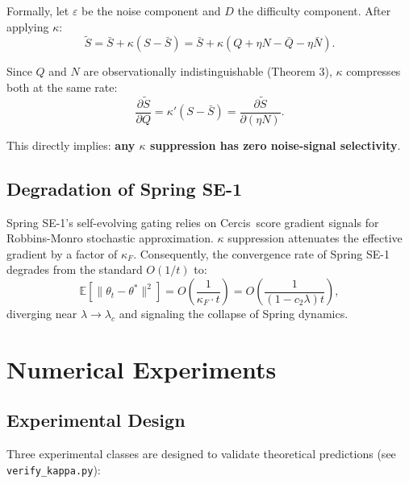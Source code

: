 \documentclass[12pt,a4paper]{article}
\theoremstyle{definition}
\newcommand{\E}{\mathbb{E}}
\newcommand{\Cercis}{\textsf{Cercis}}
\begin{document}
Formally, let $\varepsilon$ be the noise component and $D$ the difficulty component. After applying $\kappa$:
\begin{equation}
    \tilde{S} = \bar{S} + \kappa(S - \bar{S}) = \bar{S} + \kappa(Q + \eta N - \bar{Q} - \eta\bar{N}).
\end{equation}

Since $Q$ and $N$ are observationally indistinguishable (Theorem 3), $\kappa$ compresses both at the same rate:
\begin{equation}
    \frac{\partial \tilde{S}}{\partial Q} = \kappa'(S-\bar{S}) = \frac{\partial \tilde{S}}{\partial (\eta N)}.
\end{equation}

This directly implies: \textbf{any $\kappa$ suppression has zero noise-signal selectivity}.

\subsection{Degradation of Spring SE-1}

Spring SE-1's self-evolving gating relies on \Cercis~score gradient signals for Robbins-Monro stochastic approximation. $\kappa$ suppression attenuates the effective gradient by a factor of $\kappa_F$. Consequently, the convergence rate of Spring SE-1 degrades from the standard $O(1/t)$ to:
\begin{equation}
    \E[\|\theta_t - \theta^*\|^2] = O\left(\frac{1}{\kappa_F \cdot t}\right) = O\left(\frac{1}{(1-c_2\lambda)t}\right),
\end{equation}
diverging near $\lambda \to \lambda_c$ and signaling the collapse of Spring dynamics.

\section{Numerical Experiments}
\label{sec:experiments}

\subsection{Experimental Design}

Three experimental classes are designed to validate theoretical predictions (see \texttt{verify\_kappa.py}):
\end{document}

